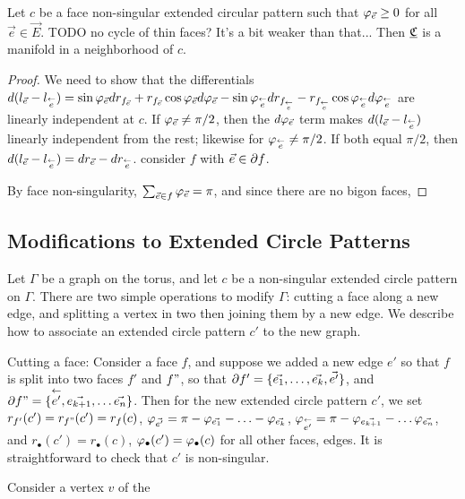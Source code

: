 \begin{lemma}
Let $c$ be a face non-singular extended circular pattern
such that $\varphi_{\vec{e}} \geq 0$ for all $\vec{e}\in\vec{E}$.
TODO no cycle of thin faces? It's a bit weaker than that...
Then ${\underline{\mathfrak{C}}}$ is a manifold in a neighborhood of $c$.
\end{lemma}
\begin{proof}
We need to show that the differentials
$d(l_{\vec{e}} - l_{\overset{\leftarrow}{e}})
= \sin \varphi_{\vec{e}} d r_{f_{\vec{e}}}
+ r_{f_{\vec{e}}} \cos \varphi_{\vec{e}} d \varphi_{\vec{e}}
- \sin \varphi_{\overset{\leftarrow}{e}} d r_{f_{\overset{\leftarrow}{e}}}
- r_{f_{\overset{\leftarrow}{e}}} \cos \varphi_{\overset{\leftarrow}{e}} d \varphi_{\overset{\leftarrow}{e}}
$
are linearly independent at $c$.
If $\varphi_{\vec{e}} \neq \pi/2$,
then the $d\varphi_{\vec{e}}$ term makes $d(l_{\vec{e}} - l_{\overset{\leftarrow}{e}})$
linearly independent from the rest;
likewise for $\varphi_{\overset{\leftarrow}{e}} \neq \pi/2$.
If both equal $\pi/2$,
then $d(l_{\vec{e}} - l_{\overset{\leftarrow}{e}}) = d r_{\vec{e}} - d r_{\overset{\leftarrow}{e}}$.
consider $f$ with $\vec{e} \in \partial f$.

By face non-singularity, $\sum_{\vec{e} \in f} \varphi_{\vec{e}} = \pi$,
and since there are no bigon faces,

\end{proof}

\subsection{Modifications to Extended Circle Patterns}


Let $\Gamma$ be a graph on the torus, and let $c$ be a
non-singular extended circle pattern on $\Gamma$.
There are two simple operations to modify $\Gamma$:
cutting a face along a new edge,
and splitting a vertex in two then joining them by a new edge.
We describe how to associate an extended circle pattern $c'$ to
the new graph.


Cutting a face: Consider a face $f$,
and suppose we added a new edge $e'$ so that $f$ is split into
two faces $f'$ and $f"$, so that
$\partial f' = \{\vec{e_1},\ldots,\vec{e_k}, \vec{e'}\}$,
and $\partial f" = \{\overset{\leftarrow}{e'}, \vec{e_{k+1}},\ldots \vec{e_n}\}$.
Then for the new extended circle pattern $c'$,
we set $r_{f'}(c') = r_{f"}(c') = r_f(c)$,
$\varphi_{\vec{e'}} = \pi - \varphi_{\vec{e_1}} - \ldots - \varphi_{\vec{e_k}}$,
$\varphi_{\overset{\leftarrow}{e'}} = \pi - \varphi_{\vec{e_{k+1}}} - \ldots \varphi_{\vec{e_n}}$,
and $r_\bullet(c') = r_\bullet(c)$, $\varphi_\bullet(c') = \varphi_\bullet(c)$
for all other faces, edges.
It is straightforward to check that $c'$ is non-singular.


Consider a vertex $v$ of the 


